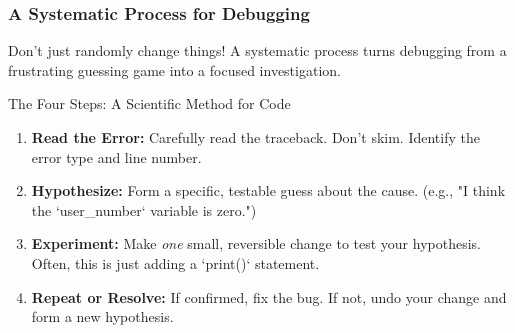 \documentclass{beamer}
\begin{document}
\begin{frame}[fragile]
    \frametitle{A Systematic Process for Debugging}

    Don't just randomly change things! A systematic process turns debugging from a frustrating guessing game into a focused investigation.
    
    \vspace{1em}
    \begin{block}{The Four Steps: A Scientific Method for Code}
        \begin{enumerate}
            \item \textbf{Read the Error:} Carefully read the traceback. Don't skim. Identify the error type and line number.
            \pause
            \item \textbf{Hypothesize:} Form a specific, testable guess about the cause. (e.g., "I think the `user_number` variable is zero.")
            \pause
            \item \textbf{Experiment:} Make \textit{one} small, reversible change to test your hypothesis. Often, this is just adding a `print()` statement.
            \pause
            \item \textbf{Repeat or Resolve:} If confirmed, fix the bug. If not, undo your change and form a new hypothesis.
        \end{enumerate}
    \end{block}
\end{frame}
\end{document}
